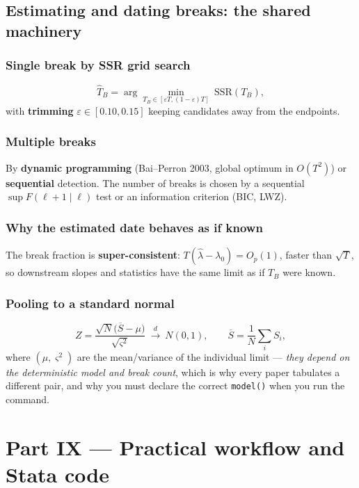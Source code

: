 \documentclass[11pt,a4paper]{article}
\newcommand{\cmd}[1]{\texttt{\textcolor{camber}{#1}}}
\newcommand{\hlt}[2]{\textcolor{#1}{\textbf{#2}}}
\theoremstyle{definition}
\begin{document}
\subsection{Estimating and dating breaks: the shared machinery}
\subsubsection{Single break by SSR grid search}
\begin{equation}
\hat T_B=\arg\min_{T_B\in[\varepsilon T,(1-\varepsilon)T]}\ \mathrm{SSR}(T_B),
\end{equation}
with \hlt{cblue}{trimming} $\varepsilon\in[0.10,0.15]$ keeping candidates away from the endpoints.

\subsubsection{Multiple breaks}
By \hlt{cblue}{dynamic programming} (Bai--Perron 2003, global optimum in $O(T^2)$) or
\hlt{cblue}{sequential} detection. The number of breaks is chosen by a sequential
$\sup F(\ell+1\mid\ell)$ test or an information criterion (BIC, LWZ).

\subsubsection{Why the estimated date behaves as if known}
The break fraction is \hlt{cred}{super-consistent}: $T(\hat\lambda-\lambda_0)=O_p(1)$, faster than
$\sqrt T$, so downstream slopes and statistics have the same limit as if $T_B$ were known.

\subsubsection{Pooling to a standard normal}
\begin{equation}
Z=\frac{\sqrt N\big(\overline S-\mu\big)}{\sqrt{\varsigma^2}}\ \xrightarrow{d}\ N(0,1),\qquad
\overline S=\frac1N\sum_i S_i,
\end{equation}
where $(\mu,\varsigma^2)$ are the mean/variance of the individual limit --- \emph{they depend on the
deterministic model and break count}, which is why every paper tabulates a different pair, and why you
must declare the correct \cmd{model()} when you run the command.

\section{Part IX --- Practical workflow and Stata code}
\end{document}
